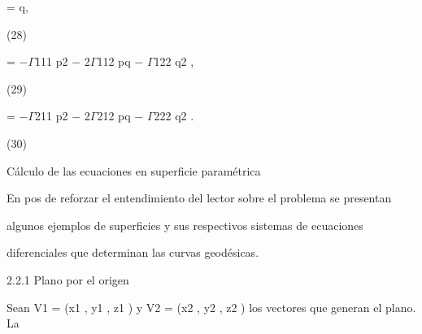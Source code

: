 \documentclass[a4paper,portrait,12pt]{article}
\begin{document}
\begin{flushleft}
= q,
\end{flushleft}





(28)





\begin{flushleft}
= $-$$\Gamma$111 p2 $-$ 2$\Gamma$112 pq $-$ $\Gamma$122 q2 ,
\end{flushleft}





(29)





\begin{flushleft}
= $-$$\Gamma$211 p2 $-$ 2$\Gamma$212 pq $-$ $\Gamma$222 q2 .
\end{flushleft}





(30)





\begin{flushleft}
Cálculo de las ecuaciones en superficie paramétrica
\end{flushleft}





\begin{flushleft}
En pos de reforzar el entendimiento del lector sobre el problema se presentan
\end{flushleft}


\begin{flushleft}
algunos ejemplos de superficies y sus respectivos sistemas de ecuaciones
\end{flushleft}


\begin{flushleft}
diferenciales que determinan las curvas geodésicas.
\end{flushleft}





\begin{flushleft}
2.2.1 Plano por el origen
\end{flushleft}


\begin{flushleft}
Sean V1 = (x1 , y1 , z1 ) y V2 = (x2 , y2 , z2 ) los vectores que generan el plano. La
\end{flushleft}
\end{document}
